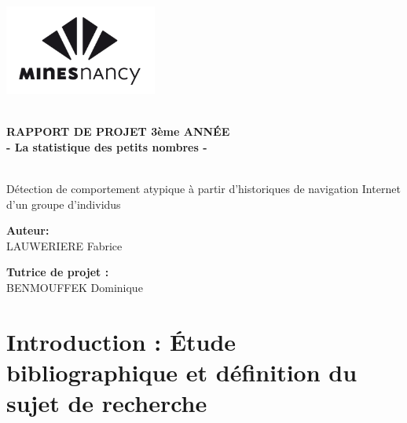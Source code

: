 \documentclass[a4paper, 11pt]{article}
\begin{document}

\begin{titlepage}
\includegraphics[width=5cm]{images/logo_mines.jpg}
\vspace{6cm}
\begin{center}
\hrulefill\\
{\LARGE \textbf{RAPPORT DE PROJET 3ème ANNÉE\\ - La statistique des petits nombres -\\}}
\hrulefill\\

\vspace{1cm}

{\Large Détection de comportement atypique à partir d'historiques de navigation Internet d'un groupe d'individus}
\vspace{2cm}

\begin{minipage}{5cm}
\begin{center}
\textbf{Auteur:}\\
LAUWERIERE Fabrice
\end{center}
\end{minipage}
\hspace{1cm}
\begin{minipage}{5cm}
\begin{center}
\textbf{Tutrice de projet :}\\
BENMOUFFEK Dominique
\end{center}
\end{minipage}
\end{center}
\end{titlepage} 

\tableofcontents




\pagestyle{fancy}
\fancyhead[L]{\leftmark}
\fancyhead[C]{}
\fancyhead[R]{}
\fancyfoot[C]{}
\fancyfoot[R]{\thepage}



\newpage

\section{Introduction : Étude bibliographique et définition du sujet de recherche}
\end{document}
